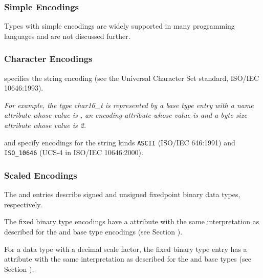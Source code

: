 \subsubsection{Simple Encodings}
\label{chap:simpleencodings}
Types with simple encodings are widely supported in many
programming languages and 
\bb
are not discussed further.
\eb

\subsubsection{Character Encodings}
\label{chap:characterencodings}
\DWATEUTF{} 
\bb
specifies the  string encoding
\eb
(see the Universal Character Set standard,
ISO/IEC 10646:1993).

\textit{For
\bb
example, the  type char16\_t is
represented by a base type entry with a name attribute whose
value is , an encoding attribute whose value
is \DWATEUTF{} and a byte size attribute whose value is 2.
\eb
}

\bb
\DWATEASCII{} and \DWATEUCS{} specify encodings for
\eb
the  string kinds 
\texttt{ASCII} (ISO/IEC 646:1991) and
\texttt{ISO\_10646} (UCS-4 in ISO/IEC 10646:2000).

\subsubsection{Scaled Encodings}
\label{chap:scaledencodings}
The \DWATEsignedfixed{} and \DWATEunsignedfixed{} entries
describe signed and unsigned fixed\dash point binary data types,
respectively.

The fixed binary type encodings have a
\DWATdigitcount{} attribute
with the same interpretation as described for the
\DWATEpackeddecimal{} and \DWATEnumericstring{} base type encodings
(see Section ).

For a data type with a decimal scale factor, the fixed binary
type entry has a \DWATdecimalscale{} attribute 
with the same interpretation as described for the 
\DWATEpackeddecimal{} and \DWATEnumericstring{} base types
(see Section ).

